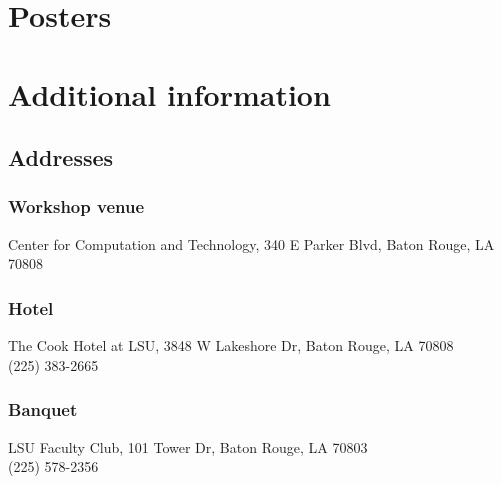 \documentclass[12pt]{book}
\newenvironment{conf-abstract}[4][]{
  \needspace{10\baselineskip}
  \begin{center}
    { \renewcommand\textsuperscript[1]{}
      \phantomsection\addcontentsline{toc}{section}
      {\texorpdfstring{#2 (\emph{#3})}{#2 (#3)}}
    }
    {{\large\bfseries #2}\marginnote{#1}\par}
    \medskip
    {#3\par}
    \smallskip
    {\small #4\par}
  \end{center}
}{%
  \bigskip
  \hrule
  \bigskip
}
\newcommand{\indexauthors}[1]{%
  \forcsvlist{\index}{#1}
}
\begin{document}
\chapter{Posters}

{
\begin{conf-abstract}[\datum\\\time]
{\title}
{\first~ \last}
{\affiliation}
\indexauthors{\last!\first}
\begin{center}

\end{center}
\end{conf-abstract}
}


%

%
%
%

\chapter{Additional information}

\section{Addresses}

\subsection*{Workshop venue}
Center for Computation and Technology, 340 E Parker Blvd, Baton Rouge, LA 70808 
\subsection*{Hotel}
The Cook Hotel at LSU, 3848 W Lakeshore Dr, Baton Rouge, LA 70808 \\
(225) 383-2665
\subsection*{Banquet}
LSU Faculty Club, 101 Tower Dr, Baton Rouge, LA 70803 \\
(225) 578-2356
\end{document}
